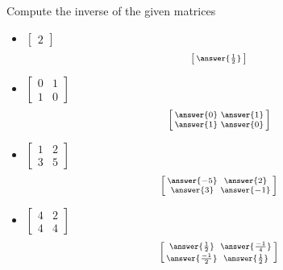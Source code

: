 \documentclass{ximera}
\begin{document}
\begin{exercise}%
    Compute the inverse of the given matrices
    \begin{itemize}
        \item
        $\begin{bmatrix}
        2
        \end{bmatrix}$
        \[
            \left[\begin{smallmatrix} \answer{\frac{1}{2}} \end{smallmatrix}\right]
        \]
        \item
        $\begin{bmatrix}
        0 & 1 \\
        1 & 0
        \end{bmatrix}$
        \[
            \left[\begin{smallmatrix} \answer{0} & \answer{1} \\ \answer{1} & \answer{0} \end{smallmatrix}\right]
        \]
        \item
        $\begin{bmatrix}
        1 & 2 \\
        3 & 5
        \end{bmatrix}$
        \[
            \left[\begin{smallmatrix} \answer{-5} & \answer{2} \\ \answer{3} & \answer{-1} \end{smallmatrix}\right]
        \]
        \item
        $\begin{bmatrix}
        4 & 2 \\
        4 & 4
        \end{bmatrix}$
        \[
            \left[\begin{smallmatrix} \answer{\frac{1}{2}} & \answer{\frac{-1}{4}} \\ \answer{\frac{-1}{2}} & \answer{\frac{1}{2}} \end{smallmatrix}\right]
        \]
    \end{itemize}
\end{exercise}
\end{document}
